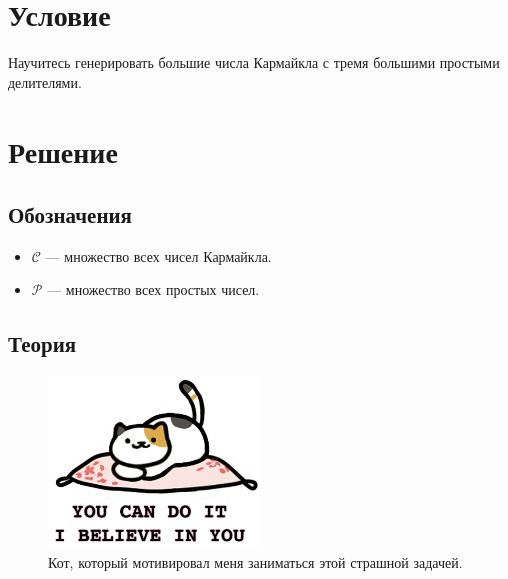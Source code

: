 

\cfoot{}



\section{Условие}

Научитесь генерировать большие числа Кармайкла с тремя большими простыми делителями.

\section{Решение}

\subsection{Обозначения}

\begin{itemize}
    \item \(\mathcal{C}\) --- множество всех чисел Кармайкла.
    \item \(\mathcal{P}\) --- множество всех простых чисел.
\end{itemize}

\subsection{Теория}

\begin{figure}
    \begin{center}
        \includegraphics[width=0.5\textwidth]{images/motivation.jpg}
        \caption{Кот, который мотивировал меня заниматься этой страшной задачей.}
    \end{center}
\end{figure}

